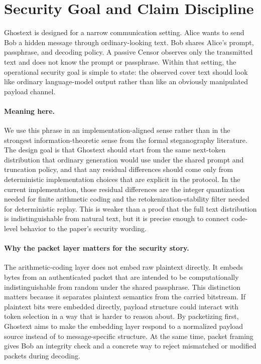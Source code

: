 \section{Security Goal and Claim Discipline}

Ghostext is designed for a narrow communication setting. Alice wants to send Bob a hidden message through ordinary-looking text. Bob shares Alice's prompt, passphrase, and decoding policy. A passive Censor observes only the transmitted text and does not know the prompt or passphrase. Within that setting, the operational security goal is simple to state: the observed cover text should look like ordinary language-model output rather than like an obviously manipulated payload channel.

\paragraph{Meaning here.} We use this phrase in an implementation-aligned sense rather than in the strongest information-theoretic sense from the formal steganography literature. The design goal is that Ghostext should start from the same next-token distribution that ordinary generation would use under the shared prompt and truncation policy, and that any residual differences should come only from deterministic implementation choices that are explicit in the protocol. In the current implementation, those residual differences are the integer quantization needed for finite arithmetic coding and the retokenization-stability filter needed for deterministic replay. This is weaker than a proof that the full text distribution is indistinguishable from natural text, but it is precise enough to connect code-level behavior to the paper's security wording.

\paragraph{Why the packet layer matters for the security story.} The arithmetic-coding layer does not embed raw plaintext directly. It embeds bytes from an authenticated packet that are intended to be computationally indistinguishable from random under the shared passphrase. This distinction matters because it separates plaintext semantics from the carried bitstream. If plaintext bits were embedded directly, payload structure could interact with token selection in a way that is harder to reason about. By packetizing first, Ghostext aims to make the embedding layer respond to a normalized payload source instead of to message-specific structure. At the same time, packet framing gives Bob an integrity check and a concrete way to reject mismatched or modified packets during decoding.

